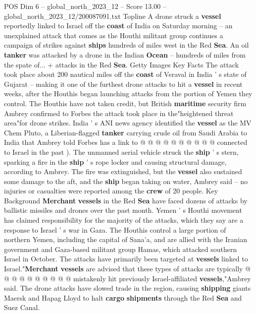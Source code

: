 \begin{textsample}{POS Dim 6 – global\_north\_2023\_12 – Score 13.00 – global\_north\_2023\_12/200087091.txt}  \label{ex:f6_pos_131}
Topline A drone struck a \textbf{vessel} reportedly linked to Israel off the \textbf{coast} of India on Saturday morning -- an unexplained attack that comes as the Houthi militant group continues a campaign of strikes against \textbf{ships} hundreds of miles west in the Red \textbf{Sea}.
An oil \textbf{tanker} was attacked by a drone in the Indian \textbf{Ocean} -- hundreds of miles from the spate of... + attacks in the Red \textbf{Sea}.
Getty Images Key Facts The attack took place about 200 nautical miles off the \textbf{coast} of Veraval in India ' s state of Gujarat -- making it one of the furthest drone attacks to hit a \textbf{vessel} in recent weeks, after the Houthis began launching attacks from the portion of Yemen they control.
The Houthis have not taken credit, but British \textbf{maritime} security firm Ambrey confirmed to Forbes the attack took place in the"heightened threat area"for drone strikes.
India ' s ANI news agency identified the \textbf{vessel} as the MV Chem Pluto, a Liberian-flagged \textbf{tanker} carrying crude oil from Saudi Arabia to India that Ambrey told Forbes has a link to @ @ @ @ @ @ @ @ @ @ connected to Israel in the past ).
The unmanned aerial vehicle struck the \textbf{ship} ' s stern, sparking a fire in the \textbf{ship} ' s rope locker and causing structural damage, according to Ambrey.
The fire was extinguished, but the \textbf{vessel} also sustained some damage to the aft, and the \textbf{ship} began taking on water, Ambrey said -- no injuries or casualties were reported among the \textbf{crew} of 20 people.
Key Background \textbf{Merchant} \textbf{vessels} in the Red \textbf{Sea} have faced dozens of attacks by ballistic missiles and drones over the past month.
Yemen ' s Houthi movement has claimed responsibility for the majority of the attacks, which they say are a response to Israel ' s war in Gaza.
The Houthis control a large portion of northern Yemen, including the capital of Sana'a, and are allied with the Iranian government and Gaza-based militant group Hamas, which attacked southern Israel in October.
The attacks have primarily been targeted at \textbf{vessels} linked to Israel."\textbf{Merchant} \textbf{vessels} are advised that these types of attacks are typically @ @ @ @ @ @ @ @ @ @ mistakenly hit previously Israel-affiliated \textbf{vessels},"Ambrey said.
The drone attacks have slowed trade in the region, causing \textbf{shipping} giants Maersk and Hapag Lloyd to halt \textbf{cargo} \textbf{shipments} through the Red \textbf{Sea} and Suez Canal.

\end{textsample}
